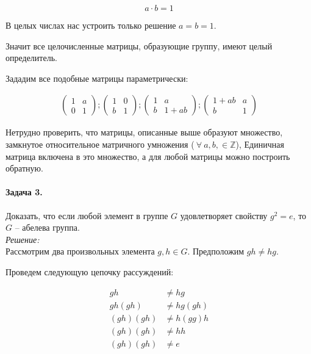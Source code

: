 \documentclass[10pt,a4paper]{article}
\begin{document}
	\begin{equation}
		\label{eq:ex_2_eq_03}
		a\cdot b = 1
	\end{equation}
	
	В целых числах нас устроить только решение $a = b = 1$.
	
	Значит все целочисленные матрицы, образующие группу, имеют целый 
	определитель.
	
	Зададим все подобные матрицы параметрически:
	
	\begin{align*}
		\begin{pmatrix}
			1 & a \\
			0 & 1
		\end{pmatrix};
		\begin{pmatrix}
			1 & 0 \\
			b & 1
		\end{pmatrix};
		\begin{pmatrix}
			1 & a \\
			b & 1 + ab 
		\end{pmatrix};
		\begin{pmatrix}
			1 + ab & a \\
			b & 1
		\end{pmatrix}
	\end{align*}
	
	Нетрудно проверить, что матрицы, описанные выше образуют множество, 
	замкнутое относительное матричного умножения ($\ \forall \ a, b, \in 
	\mathbb{Z}$), Единичная матрица включена в это множество, а для любой 
	матрицы можно построить обратную. 
	
	\paragraph{Задача 3.} Доказать, что если любой элемент в группе $G$ 
	удовлетворяет свойству $g^{2} = e$, то $G$ -- абелева группа.\\
	
	\textit{Решение:}\\
	
	Рассмотрим два произвольных элемента $g, h \in G$. Предположим $gh \neq hg$.
	
	Проведем следующую цепочку рассуждений:
	
	\begin{align}
		\label{eq:ex_3_eq_01}
		gh &\neq hg\\
		\label{eq:ex_3_eq_02}
		gh\left(gh\right) &\neq hg\left(gh\right)\\
		\label{eq:ex_3_eq_03}
		\left(gh\right)\left(gh\right) &\neq h\left(gg\right)h\\
		\label{eq:ex_3_eq_04}
		\left(gh\right)\left(gh\right) &\neq hh\\
		\label{eq:ex_3_eq_05}
		\left(gh\right)\left(gh\right) &\neq e
	\end{align}
	
\end{document}
